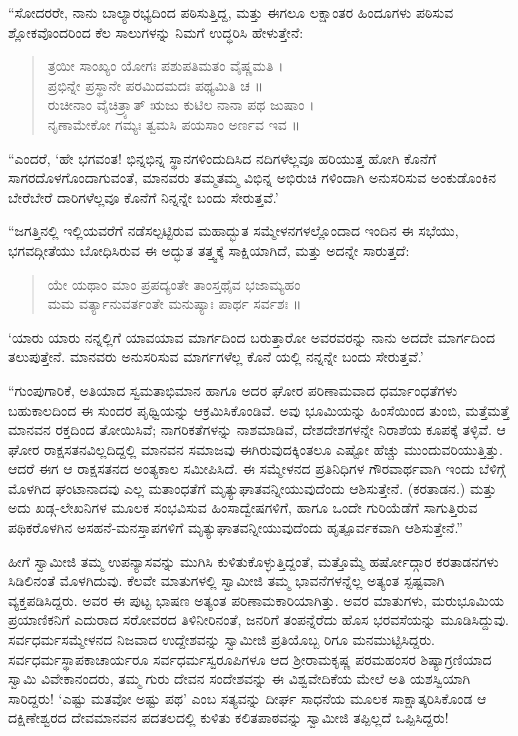 “ಸೋದರರೇ, ನಾನು ಬಾಲ್ಯಾರಭ್ಯದಿಂದ ಪಠಿಸುತ್ತಿದ್ದ, ಮತ್ತು ಈಗಲೂ ಲಕ್ಷಾಂತರ ಹಿಂದೂಗಳು ಪಠಿಸುವ ಶ್ಲೋಕವೊಂದರಿಂದ ಕೆಲ ಸಾಲುಗಳನ್ನು ನಿಮಗೆ ಉದ್ಧರಿಸಿ ಹೇಳುತ್ತೇನೆ:

\begin{verse}
ತ್ರಯೀ ಸಾಂಖ್ಯಂ ಯೋಗಃ ಪಶುಪತಿಮತಂ ವೈಷ್ಣಮತಿ ।\\ಪ್ರಭಿನ್ನೇ ಪ್ರಸ್ಥಾನೇ ಪರಮಿದಮದಃ ಪಥ್ಯಮಿತಿ ಚ ॥\\ರುಚೀನಾಂ ವೈಚಿತ್ರ್ಯಾತ್ ಋಜು ಕುಟಿಲ ನಾನಾ ಪಥ ಜುಷಾಂ ।\\ನೃಣಾಮೇಕೋ ಗಮ್ಯಃ ತ್ವಮಸಿ ಪಯಸಾಂ ಅರ್ಣವ ಇವ ॥
\end{verse}

“ಎಂದರೆ, ‘ಹೇ ಭಗವಂತ! ಭಿನ್ನಭಿನ್ನ ಸ್ಥಾನಗಳಿಂದುದಿಸಿದ ನದಿಗಳೆಲ್ಲವೂ ಹರಿಯುತ್ತ ಹೋಗಿ ಕೊನೆಗೆ ಸಾಗರದೊಳಗೊಂದಾಗುವಂತೆ, ಮಾನವರು ತಮ್ಮತಮ್ಮ ವಿಭಿನ್ನ ಅಭಿರುಚಿ ಗಳಿಂದಾಗಿ ಅನುಸರಿಸುವ ಅಂಕುಡೊಂಕಿನ ಬೇರೆಬೇರೆ ದಾರಿಗಳೆಲ್ಲವೂ ಕೊನೆಗೆ ನಿನ್ನನ್ನೇ ಬಂದು ಸೇರುತ್ತವೆ.’

“ಜಗತ್ತಿನಲ್ಲಿ ಇಲ್ಲಿಯವರೆಗೆ ನಡೆಸಲ್ಪಟ್ಟಿರುವ ಮಹಾದ್ಭುತ ಸಮ್ಮೇಳನಗಳಲ್ಲೊಂದಾದ ಇಂದಿನ ಈ ಸಭೆಯು, ಭಗವದ್ಗೀತೆಯು ಬೋಧಿಸಿರುವ ಈ ಅದ್ಭುತ ತತ್ತ್ವಕ್ಕೆ ಸಾಕ್ಷಿಯಾಗಿದೆ, ಮತ್ತು ಅದನ್ನೇ ಸಾರುತ್ತದೆ:

\begin{verse}
ಯೇ ಯಥಾಂ ಮಾಂ ಪ್ರಪದ್ಯಂತೇ ತಾಂಸ್ತಥೈವ ಭಜಾಮ್ಯಹಂ\\ಮಮ ವರ್ತ್ಯಾನುವರ್ತಂತೇ ಮನುಷ್ಯಾಃ ಪಾರ್ಥ ಸರ್ವಶಃ ॥
\end{verse}

‘ಯಾರು ಯಾರು ನನ್ನಲ್ಲಿಗೆ ಯಾವಯಾವ ಮಾರ್ಗದಿಂದ ಬರುತ್ತಾರೋ ಅವರವರನ್ನು ನಾನು ಅದದೇ ಮಾರ್ಗದಿಂದ ತಲುಪುತ್ತೇನೆ. ಮಾನವರು ಅನುಸರಿಸುವ ಮಾರ್ಗಗಳೆಲ್ಲ ಕೊನೆ ಯಲ್ಲಿ ನನ್ನನ್ನೇ ಬಂದು ಸೇರುತ್ತವೆ.’

“ಗುಂಪುಗಾರಿಕೆ, ಅತಿಯಾದ ಸ್ವಮತಾಭಿಮಾನ ಹಾಗೂ ಅದರ ಘೋರ ಪರಿಣಾಮವಾದ ಧರ್ಮಾಂಧತೆಗಳು ಬಹುಕಾಲದಿಂದ ಈ ಸುಂದರ ಪೃಥ್ವಿಯನ್ನು ಆಕ್ರಮಿಸಿಕೊಂಡಿವೆ. ಅವು ಭೂಮಿಯನ್ನು ಹಿಂಸೆಯಿಂದ ತುಂಬಿ, ಮತ್ತೆಮತ್ತೆ ಮಾನವನ ರಕ್ತದಿಂದ ತೋಯಿಸಿವೆ; ನಾಗರಿಕತೆಗಳನ್ನು ನಾಶಮಾಡಿವೆ, ದೇಶದೇಶಗಳನ್ನೇ ನಿರಾಶೆಯ ಕೂಪಕ್ಕೆ ತಳ್ಳಿವೆ. ಆ ಘೋರ ರಾಕ್ಷಸತನವಿಲ್ಲದಿದ್ದಲ್ಲಿ ಮಾನವನ ಸಮಾಜವು ಈಗಿರುವುದಕ್ಕಿಂತಲೂ ಎಷ್ಟೋ ಹೆಚ್ಚು ಮುಂದುವರಿಯುತ್ತಿತ್ತು. ಆದರೆ ಈಗ ಆ ರಾಕ್ಷಸತನದ ಅಂತ್ಯಕಾಲ ಸಮೀಪಿಸಿದೆ. ಈ ಸಮ್ಮೇಳನದ ಪ್ರತಿನಿಧಿಗಳ ಗೌರವಾರ್ಥವಾಗಿ ಇಂದು ಬೆಳಿಗ್ಗೆ ಮೊಳಗಿದ ಘಂಟಾನಾದವು ಎಲ್ಲ ಮತಾಂಧತೆಗೆ ಮೃತ್ಯುಘಾತವನ್ನೀಯುವುದೆಂದು ಆಶಿಸುತ್ತೇನೆ. (ಕರತಾಡನ.) ಮತ್ತು ಅದು ಖಡ್ಗ-ಲೇಖನಿಗಳ ಮೂಲಕ ಸಂಭವಿಸುವ ಹಿಂಸಾದ್ವೇಷಗಳಿಗೆ, ಹಾಗೂ ಒಂದೇ ಗುರಿಯೆಡೆಗೆ ಸಾಗುತ್ತಿರುವ ಪಥಿಕರೊಳಗಿನ ಅಸಹನೆ-ಮನಸ್ತಾಪಗಳಿಗೆ ಮೃತ್ಯುಘಾತವನ್ನೀಯುವುದೆಂದು ಹೃತ್ಪೂರ್ವಕವಾಗಿ ಆಶಿಸುತ್ತೇನೆ.”

ಹೀಗೆ ಸ್ವಾಮೀಜಿ ತಮ್ಮ ಉಪನ್ಯಾಸವನ್ನು ಮುಗಿಸಿ ಕುಳಿತುಕೊಳ್ಳುತ್ತಿದ್ದಂತೆ, ಮತ್ತೊಮ್ಮೆ ಹರ್ಷೋದ್ಗಾರ ಕರತಾಡನಗಳು ಸಿಡಿಲಿನಂತೆ ಮೊಳಗಿದುವು. ಕೆಲವೇ ಮಾತುಗಳಲ್ಲಿ ಸ್ವಾಮೀಜಿ ತಮ್ಮ ಭಾವನೆಗಳನ್ನೆಲ್ಲ ಅತ್ಯಂತ ಸ್ಪಷ್ಟವಾಗಿ ವ್ಯಕ್ತಪಡಿಸಿದ್ದರು. ಅವರ ಈ ಪುಟ್ಟ ಭಾಷಣ ಅತ್ಯಂತ ಪರಿಣಾಮಕಾರಿಯಾಗಿತ್ತು. ಅವರ ಮಾತುಗಳು, ಮರುಭೂಮಿಯ ಪ್ರಯಾಣಿಕನಿಗೆ ಎದುರಾದ ಸರೋವರದ ತಿಳಿನೀರಿನಂತೆ, ಜನರಿಗೆ ತಂಪನ್ನೆರೆದು ಹೊಸ ಭರವಸೆಯನ್ನು ಮೂಡಿಸಿದ್ದುವು. ಸರ್ವಧರ್ಮಸಮ್ಮೇಳನದ ನಿಜವಾದ ಉದ್ದೇಶವನ್ನು ಸ್ವಾಮೀಜಿ ಪ್ರತಿಯೊಬ್ಬ ರಿಗೂ ಮನಮುಟ್ಟಿಸಿದ್ದರು. ಸರ್ವಧರ್ಮಸ್ಥಾಪಕಾಚಾರ್ಯರೂ ಸರ್ವಧರ್ಮಸ್ವರೂಪಿಗಳೂ ಆದ ಶ್ರೀರಾಮಕೃಷ್ಣ ಪರಮಹಂಸರ ಶಿಷ್ಯಾಗ್ರಣಿಯಾದ ಸ್ವಾಮಿ ವಿವೇಕಾನಂದರು, ತಮ್ಮ ಗುರು ದೇವನ ಸಂದೇಶವನ್ನು ಈ ವಿಶ್ವವೇದಿಕೆಯ ಮೇಲೆ ಅತಿ ಯಶಸ್ವಿಯಾಗಿ ಸಾರಿದ್ದರು! ‘ಎಷ್ಟು ಮತವೋ ಅಷ್ಟು ಪಥ’ ಎಂಬ ಸತ್ಯವನ್ನು ದೀರ್ಘ ಸಾಧನೆಯ ಮೂಲಕ ಸಾಕ್ಷಾತ್ಕರಿಸಿಕೊಂಡ ಆ ದಕ್ಷಿಣೇಶ್ವರದ ದೇವಮಾನವನ ಪದತಲದಲ್ಲಿ ಕುಳಿತು ಕಲಿತಪಾಠವನ್ನು ಸ್ವಾಮೀಜಿ ತಪ್ಪಿಲ್ಲದೆ ಒಪ್ಪಿಸಿದ್ದರು!

